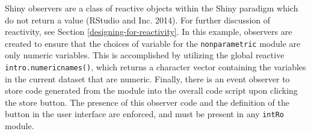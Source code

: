 \documentclass[12pt,]{article}
\newenvironment{Shaded}{\begin{snugshade}}{\end{snugshade}}
\newcommand{\KeywordTok}[1]{\textcolor[rgb]{0.13,0.29,0.53}{\textbf{{#1}}}}
\newcommand{\DataTypeTok}[1]{\textcolor[rgb]{0.13,0.29,0.53}{{#1}}}
\newcommand{\DecValTok}[1]{\textcolor[rgb]{0.00,0.00,0.81}{{#1}}}
\newcommand{\CharTok}[1]{\textcolor[rgb]{0.31,0.60,0.02}{{#1}}}
\newcommand{\StringTok}[1]{\textcolor[rgb]{0.31,0.60,0.02}{{#1}}}
\newcommand{\OtherTok}[1]{\textcolor[rgb]{0.56,0.35,0.01}{{#1}}}
\newcommand{\NormalTok}[1]{{#1}}
\begin{document}
\begin{Shaded}
\end{Shaded}

Shiny observers are a class of reactive objects within the Shiny
paradigm which do not return a value (RStudio and Inc. 2014). For
further discussion of reactivity, see Section
\ref{designing-for-reactivity}. In this example, observers are created
to ensure that the choices of variable for the \texttt{nonparametric}
module are only numeric variables. This is accomplished by utilizing the
global reactive \texttt{intro.numericnames()}, which returns a character
vector containing the variables in the current dataset that are numeric.
Finally, there is an event observer to store code generated from the
module into the overall code script upon clicking the store button. The
presence of this observer code and the definition of the button in the
user interface are enforced, and must be present in any \texttt{intRo}
module.
\end{document}
